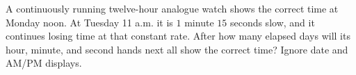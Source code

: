 A continuously running twelve-hour analogue watch shows the correct time at Monday noon. At Tuesday 11 a.m. it is $1$ minute $15$ seconds slow, and it continues losing time at that constant rate. After how many elapsed days will its hour, minute, and second hands next all show the correct time? Ignore date and AM/PM displays.
